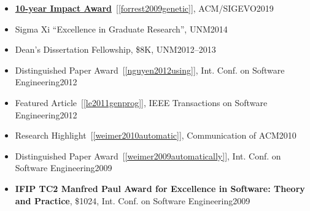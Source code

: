 \documentclass[11pt]{article}
\begin{document}
\begin{itemize}
    
    \item \href{https://sig.sigevo.org/index.html/tiki-index.php?page=SIGEVO+Impact+Award}{\textbf{10-year Impact Award}}~[\ref{forrest2009genetic}], ACM/SIGEVO\hfill 2019
    
    \item  Sigma Xi ``Excellence in Graduate Research'', UNM\hfill 2014
    \item Dean's Dissertation Fellowship, \$8K, UNM\hfill 2012--2013
    
    \item Distinguished Paper Award~[\ref{nguyen2012using}], Int. Conf. on Software Engineering\hfill 2012
    
    \item Featured Article~[\ref{le2011genprog}], IEEE Transactions on Software Engineering\hfill 2012
    
    \item Research Highlight~[\ref{weimer2010automatic}], Communication of ACM\hfill 2010
    
    \item Distinguished Paper Award~[\ref{weimer2009automatically}], Int. Conf. on Software Engineering\hfill 2009
    
    \item \textbf{IFIP TC2 Manfred Paul Award for Excellence in Software: Theory and Practice}, \$1024, Int. Conf. on Software Engineering\hfill 2009
    

\end{itemize}
\end{document}
